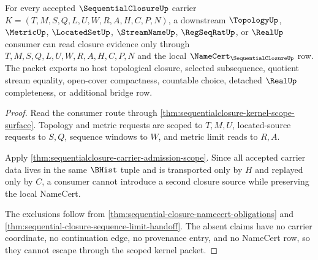 \begin{theorem}
\label{thm:sequentialclosure-nonescape-scope}
For every accepted $\SequentialClosureUp$ carrier $K=(T,M,S,Q,L,U,W,R,A,H,C,P,N)$, a downstream $\TopologyUp$, $\MetricUp$, $\LocatedSetUp$, $\StreamNameUp$, $\RegSeqRatUp$, or $\RealUp$ consumer can read closure evidence only through $T,M,S,Q,L,U,W,R,A,H,C,P,N$ and the local $\NameCert_{\SequentialClosureUp}$ row. The packet exports no host topological closure, selected subsequence, quotient stream equality, open-cover compactness, countable choice, detached $\RealUp$ completeness, or additional bridge row.
\end{theorem}
\begin{proof}
Read the consumer route through \autoref{thm:sequentialclosure-kernel-scope-surface}. Topology and metric requests are scoped to $T,M,U$, located-source requests to $S,Q$, sequence windows to $W$, and metric limit reads to $R,A$.

Apply \autoref{thm:sequentialclosure-carrier-admission-scope}. Since all accepted carrier data lives in the same $\BHist$ tuple and is transported only by $H$ and replayed only by $C$, a consumer cannot introduce a second closure source while preserving the local NameCert.

The exclusions follow from \autoref{thm:sequential-closure-namecert-obligations} and \autoref{thm:sequential-closure-sequence-limit-handoff}. The absent claims have no carrier coordinate, no continuation edge, no provenance entry, and no NameCert row, so they cannot escape through the scoped kernel packet.
\end{proof}

